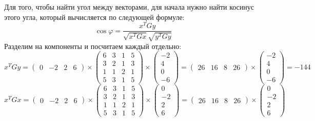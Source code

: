 \documentclass{article}
\begin{document}
\begin{center}
    Для того, чтобы найти угол между векторами, для начала нужно найти косинус этого угла, который вычисляется по следующей формуле:
    $$\cos\varphi = \frac{x^{T}Gy}{\sqrt{x^{T}Gx}\sqrt{y^{T}Gy}}$$
    Разделим на компоненты и посчитаем каждый отдельно:
    $$x^{T}Gy = \begin{pmatrix}
            0 & -2 & 2 & 6
        \end{pmatrix}\times\begin{pmatrix}
            6 & 3 & 1 & 5 \\
            3 & 2 & 1 & 3 \\
            1 & 1 & 2 & 1 \\
            5 & 3 & 1 & 5
        \end{pmatrix}\times\begin{pmatrix}
            -2 \\ 4 \\ 0 \\ -6
        \end{pmatrix} = \begin{pmatrix}
            26 & 16 & 8 & 26
        \end{pmatrix} \times \begin{pmatrix}
            -2 \\ 4 \\ 0 \\ -6
        \end{pmatrix} = -144$$
    $$x^{T}Gx = \begin{pmatrix}
            0 & -2 & 2 & 6
        \end{pmatrix}\times\begin{pmatrix}
            6 & 3 & 1 & 5 \\
            3 & 2 & 1 & 3 \\
            1 & 1 & 2 & 1 \\
            5 & 3 & 1 & 5
        \end{pmatrix}\times\begin{pmatrix}
            0 \\ -2 \\ 2 \\ 6
        \end{pmatrix} = \begin{pmatrix}
            26 & 16 & 8 & 26
        \end{pmatrix} \times \begin{pmatrix}
            0 \\ -2 \\ 2 \\ 6

\end{pmatrix}$$
\end{center}
\end{document}
